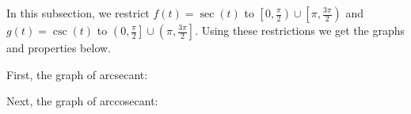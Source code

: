 \documentclass{ximera}
\begin{document}
In this subsection, we restrict $f(t) = \sec(t)$ to $\left[0, \frac{\pi}{2}\right) \cup \left[\pi, \frac{3\pi}{2}\right)$  and  $g(t) = \csc(t)$ to $\left(0, \frac{\pi}{2}\right] \cup \left( \pi, \frac{3\pi}{2}\right]$.  Using these restrictions we get the graphs and properties below.

First, the graph of arcsecant:
\begin{center}
\end{center}

Next, the graph of arccosecant:
\begin{center}
\end{center}


\end{document}
